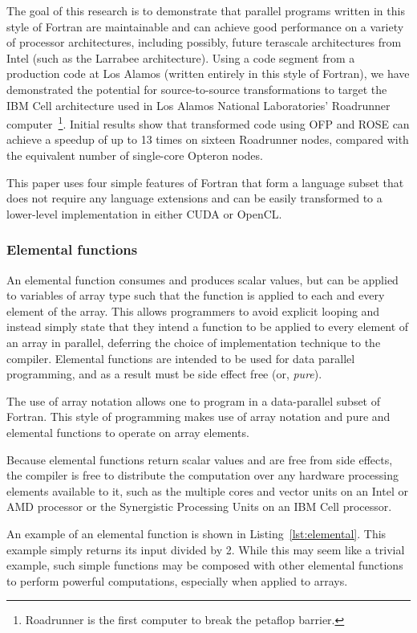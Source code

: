 \documentclass[10pt, conference, compsocconf]{IEEEtran}
\begin{document}
The goal of this research is to demonstrate that parallel programs written in
this style of Fortran are maintainable and can achieve good performance on a
variety of processor architectures, including possibly, future terascale
architectures from Intel (such as the Larrabee architecture).  Using a code
segment from a production code at Los Alamos (written entirely in this style
of Fortran), we have demonstrated the potential for source-to-source
transformations to target the IBM Cell architecture used in Los Alamos
National Laboratories' Roadrunner computer~\footnote{Roadrunner is the first
  computer to break the petaflop barrier.}.  Initial results show that
transformed code using OFP and ROSE can achieve a speedup of up to 13 times on
sixteen Roadrunner nodes, compared with the equivalent number of single-core
Opteron nodes.

This paper uses four simple features of Fortran that form a language subset
that does not require any language extensions and can be easily transformed
to a lower-level implementation in either CUDA or OpenCL.

\subsubsection*{Elemental functions}

An elemental function consumes and produces scalar values, but can be
applied to variables of array type such that the function is
applied to each and every element of the array.  This allows programmers
to avoid explicit looping and instead simply state that they intend a
function to be applied to every element of an array in parallel, deferring
the choice of implementation technique to the compiler.  Elemental
functions are intended to be used for data parallel programming, and
as a result must be side effect free (or, \emph{pure}).

The use of array notation allows one to program in a data-parallel subset of
Fortran. This style of programming makes use of array notation and pure and
elemental functions to operate on array elements.

Because elemental functions return scalar values and are free from side
effects, the compiler is free to distribute the computation over any hardware
processing elements available to it, such as the multiple cores and vector
units on an Intel or AMD processor or the Synergistic Processing Units on an
IBM Cell processor.

An example of an elemental function is shown in Listing~\ref{lst:elemental}.
This example simply returns its input divided by 2. While this may seem like a
trivial example, such simple functions may be composed with other elemental
functions to perform powerful computations, especially when applied to arrays.
\end{document}
